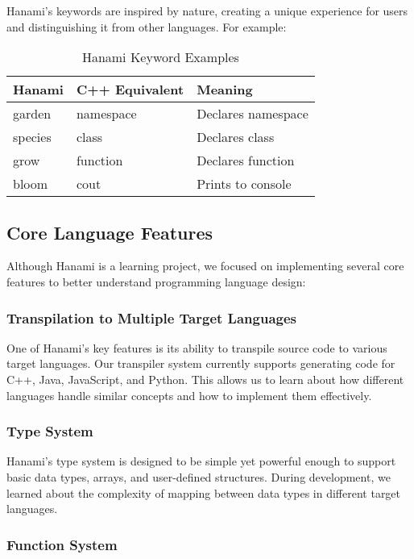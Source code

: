 \documentclass[conference]{IEEEtran}
\begin{document}
	Hanami's keywords are inspired by nature, creating a unique experience for users and distinguishing it from other languages. For example:
	
	\begin{table}[!t]
		\caption{Hanami Keyword Examples}
		\label{table:keywords}
		\centering
		\begin{tabular}{|l|l|l|}
			\hline
			\textbf{Hanami} & \textbf{C++ Equivalent} & \textbf{Meaning} \\
			\hline
			garden & namespace & Declares namespace \\
			\hline
			species & class & Declares class \\
			\hline
			grow & function & Declares function \\
			\hline
			bloom & cout & Prints to console \\
			\hline
		\end{tabular}
	\end{table}
	
	\subsection{Core Language Features}
	
	Although Hanami is a learning project, we focused on implementing several core features to better understand programming language design:
	
	\subsubsection{Transpilation to Multiple Target Languages}
	
	One of Hanami's key features is its ability to transpile source code to various target languages. Our transpiler system currently supports generating code for C++, Java, JavaScript, and Python. This allows us to learn about how different languages handle similar concepts and how to implement them effectively.
	
	\subsubsection{Type System}
	
	Hanami's type system is designed to be simple yet powerful enough to support basic data types, arrays, and user-defined structures. During development, we learned about the complexity of mapping between data types in different target languages.
	
	\subsubsection{Function System}
	
\end{document}

